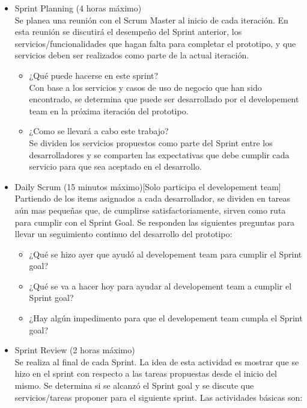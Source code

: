 \begin{itemize}
  \item Sprint Planning (4 horas máximo)\\
  Se planea una reunión con el Scrum Master al inicio de cada iteración. En esta reunión se discutirá el desempeño del Sprint anterior, los servicios/funcionalidades que hagan falta para completar el prototipo, y que servicios deben ser realizados como parte de la actual iteración.
	\begin{itemize}
	  \item ¿Qué puede hacerse en este sprint? \\
	    Con base a los servicios y casos de uso de negocio que han sido encontrado, se determina que puede ser desarrollado por el developement team en la próxima iteración del prototipo.
	  \item ¿Como se llevará a cabo este trabajo? \\
	    Se dividen los servicios propuestos como parte del Sprint entre los desarrolladores y se comparten las expectativas que debe cumplir cada servicio para que sea aceptado en el desarrollo.
	\end{itemize}
  \item Daily Scrum (15 minutos máximo)[Solo participa el developement team] \\
  Partiendo de los items asignados a cada desarrollador, se dividen en tareas aún mas pequeñas que, de cumplirse satisfactoriamente, sirven como ruta para cumplir con el Sprint Goal. Se responden las siguientes preguntas para llevar un seguimiento continuo del desarrollo del prototipo:
	\begin{itemize}
	  \item ¿Qué se hizo ayer que ayudó al developement team para cumplir el Sprint goal?
	  \item ¿Qué se va a hacer hoy para ayudar al developement team a cumplir el Sprint goal?
	  \item ¿Hay algún impedimento para que el developement team cumpla el Sprint goal?
	\end{itemize}
  \item Sprint Review (2 horas máximo) \\
  Se realiza al final de cada Sprint. La idea de esta actividad es mostrar que se hizo en el sprint con respecto a las tareas propuestas desde el inicio del mismo. Se determina si se alcanzó el Sprint goal y se discute que servicios/tareas proponer para el siguiente sprint. Las actividades básicas son:
	\begin{itemize}

\end{itemize}
\end{itemize}
